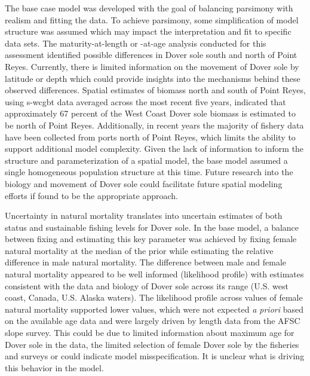 \documentclass[11pt,
  english,
  a4paper,
]{article}
\begin{document}

The base case model was developed with the goal of balancing parsimony with realism and fitting the data. To achieve parsimony, some simplification of model structure was assumed which may impact the interpretation and fit to specific data sets. The maturity-at-length or -at-age analysis conducted for this assessment identified possible differences in Dover sole south and north of Point Reyes. Currently, there is limited information on the movement of Dover sole by latitude or depth which could provide insights into the mechanisms behind these observed differences. Spatial estimates of biomass north and south of Point Reyes, using \gls{s-wcgbt} data averaged across the most recent five years, indicated that approximately 67 percent of the West Coast Dover sole biomass is estimated to be north of Point Reyes. Additionally, in recent years the majority of fishery data have been collected from ports north of Point Reyes, which limits the ability to support additional model complexity. Given the lack of information to inform the structure and parameterization of a spatial model, the base model assumed a single homogeneous population structure at this time. Future research into the biology and movement of Dover sole could facilitate future spatial modeling efforts if found to be the appropriate approach.

\leavevmode\tagmcend\tagstructend\par


Uncertainty in natural mortality translates into uncertain estimates of both status and sustainable fishing levels for Dover sole. In the base model, a balance between fixing and estimating this key parameter was achieved by fixing female natural mortality at the median of the prior while estimating the relative difference in male natural mortality. The difference between male and female natural mortality appeared to be well informed (likelihood profile) with estimates consistent with the data and biology of Dover sole across its range (U.S. west coast, Canada, U.S. Alaska waters). The likelihood profile across values of female natural mortality supported lower values, which were not expected \emph{a priori} based on the available age data and were largely driven by length data from the AFSC slope survey. This could be due to limited information about maximum age for Dover sole in the data, the limited selection of female Dover sole by the fisheries and surveys or could indicate model misspecification. It is unclear what is driving this behavior in the model.
\end{document}
